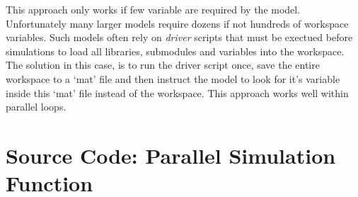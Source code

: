 This approach only works if few variable are required by the model. Unfortunately many larger models require dozens if not hundreds of workspace variables. Such models often rely on \textit{driver} scripts that must be exectued before simulations to load all libraries, submodules and variables into the workspace. The solution in this case, is to run the driver script once, save the entire workspace to a `mat' file and then instruct the model to look for it's variable inside this `mat' file instead of the workspace. This approach works well within parallel loops.

\section{Source Code: Parallel Simulation Function}
\label{app:parsimcode}




